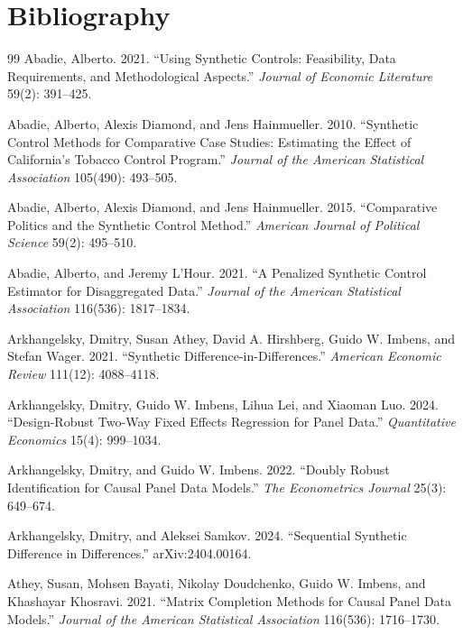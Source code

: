 \documentclass[11pt]{article}
\theoremstyle{definition}
\theoremstyle{plain}
\theoremstyle{remark}
\begin{document}
\section*{Bibliography}
\begin{thebibliography}{99}
Abadie, Alberto. 2021. ``Using Synthetic Controls: Feasibility, Data Requirements, and Methodological Aspects.'' \emph{Journal of Economic Literature} 59(2): 391--425.

Abadie, Alberto, Alexis Diamond, and Jens Hainmueller. 2010. ``Synthetic Control Methods for Comparative Case Studies: Estimating the Effect of California's Tobacco Control Program.'' \emph{Journal of the American Statistical Association} 105(490): 493--505.

Abadie, Alberto, Alexis Diamond, and Jens Hainmueller. 2015. ``Comparative Politics and the Synthetic Control Method.'' \emph{American Journal of Political Science} 59(2): 495--510.

Abadie, Alberto, and Jeremy L'Hour. 2021. ``A Penalized Synthetic Control Estimator for Disaggregated Data.'' \emph{Journal of the American Statistical Association} 116(536): 1817--1834.

Arkhangelsky, Dmitry, Susan Athey, David A. Hirshberg, Guido W. Imbens, and Stefan Wager. 2021. ``Synthetic Difference-in-Differences.'' \emph{American Economic Review} 111(12): 4088--4118.

Arkhangelsky, Dmitry, Guido W. Imbens, Lihua Lei, and Xiaoman Luo. 2024. ``Design-Robust Two-Way Fixed Effects Regression for Panel Data.'' \emph{Quantitative Economics} 15(4): 999--1034.

Arkhangelsky, Dmitry, and Guido W. Imbens. 2022. ``Doubly Robust Identification for Causal Panel Data Models.'' \emph{The Econometrics Journal} 25(3): 649--674.

Arkhangelsky, Dmitry, and Aleksei Samkov. 2024. ``Sequential Synthetic Difference in Differences.'' arXiv:2404.00164.

Athey, Susan, Mohsen Bayati, Nikolay Doudchenko, Guido W. Imbens, and Khashayar Khosravi. 2021. ``Matrix Completion Methods for Causal Panel Data Models.'' \emph{Journal of the American Statistical Association} 116(536): 1716--1730.


\end{thebibliography}
\end{document}
